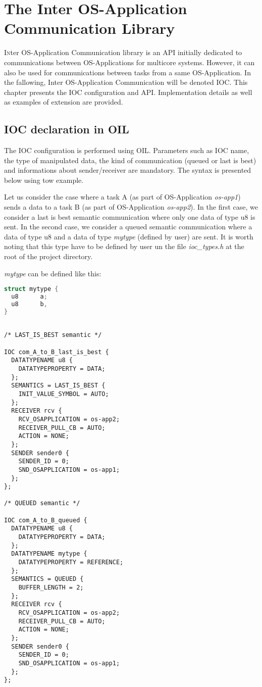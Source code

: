 
\chapter{The Inter OS-Application Communication Library}

\lettrine{I}nter OS-Application Communication library is an API initially dedicated to communications between OS-Applications for multicore systems. However, it can also be used for communications between tasks from a same OS-Application. In the fallowing, Inter OS-Application Communication will be denoted IOC.
This chapter presents the IOC configuration and API.
Implementation details as well as examples of extension are provided.

\section{IOC declaration in OIL}

The IOC configuration is performed using OIL. Parameters such as IOC name, the type of manipulated data, the kind of communication (queued or last is best) and informations about sender/receiver are mandatory. The syntax is presented below using tow example.

Let us consider the case where a task A (as part of OS-Application \textit{os-app1}) sends a data to a task B (as part of OS-Application \textit{os-app2}). 
In the first case, we consider a last is best semantic communication where only one data of type u8 is sent.
In the second case, we consider a queued semantic communication where a data of type u8 and a data of type \textit{mytype} (defined by user) are sent. It is worth noting that this type have to be defined by user un the file \textit{ioc_types.h} at the root of the project directory.

\textit{mytype} can be defined like this:

\begin{lstlisting}[language=C]
struct mytype {
  u8	  a;
  u8	  b,
}
\end{lstlisting}

\begin{lstlisting}[language=OIL]

/* LAST_IS_BEST semantic */

IOC com_A_to_B_last_is_best {
  DATATYPENAME u8 {
    DATATYPEPROPERTY = DATA;
  };
  SEMANTICS = LAST_IS_BEST {
    INIT_VALUE_SYMBOL = AUTO;
  };
  RECEIVER rcv {
    RCV_OSAPPLICATION = os-app2;
    RECEIVER_PULL_CB = AUTO;
    ACTION = NONE;
  };
  SENDER sender0 {
    SENDER_ID = 0;
    SND_OSAPPLICATION = os-app1;
  };
}; 

/* QUEUED semantic */

IOC com_A_to_B_queued {
  DATATYPENAME u8 {
    DATATYPEPROPERTY = DATA;
  };
  DATATYPENAME mytype {
    DATATYPEPROPERTY = REFERENCE;
  };
  SEMANTICS = QUEUED {
    BUFFER_LENGTH = 2;
  };
  RECEIVER rcv {
    RCV_OSAPPLICATION = os-app2;
    RECEIVER_PULL_CB = AUTO;
    ACTION = NONE;
  };
  SENDER sender0 {
    SENDER_ID = 0;
    SND_OSAPPLICATION = os-app1;
  };
}; 

\end{lstlisting}

